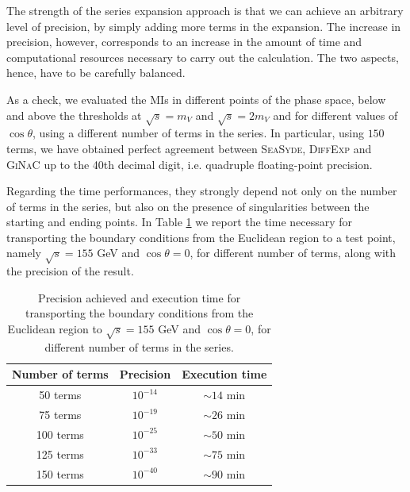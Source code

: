 The strength of the series expansion approach is that we can achieve an arbitrary level of precision, by simply adding more terms in the expansion. The increase in precision, however, corresponds to an increase in the amount of time and computational resources necessary to carry out the calculation. The two aspects, hence, have to be carefully balanced.

As a check, we evaluated the MIs in different points of the phase space, below and above the thresholds at $\sqrt{s}=m_V$ and $\sqrt{s}=2 m_V$ and for different values of $\cos\theta$, using a different number of terms in the series. In particular, using $150$ terms, we have obtained perfect agreement between \textsc{SeaSyde}, \textsc{DiffExp} and \textsc{GiNaC} up to the 40th decimal digit, i.e. quadruple floating-point precision. 

Regarding the time performances, they strongly depend not only on the number of terms in the series, but also on the presence of singularities between the starting and ending points. In Table \ref{table:checks} we report the time necessary for transporting the boundary conditions from the Euclidean region to a test point, namely $\sqrt{s}=155$ GeV and $\cos\theta=0$, for different number of terms, along with the precision of the result.

\begin{table}[ht!]
    \centering
    \begin{tabular}{c c c}
    \toprule
    Number of terms & Precision & Execution time\\
    \toprule
    50 terms & $10^{-14}$ & $\sim 14$ min\\
    \midrule
    75 terms & $10^{-19}$ & $\sim 26$ min\\
    \midrule
    100 terms & $10^{-25}$ & $\sim 50$ min\\
    \midrule
    125 terms & $10^{-33}$ & $\sim 75$ min\\
    \midrule
    150 terms & $10^{-40}$ & $\sim 90$ min\\
    \toprule
    \end{tabular}
    \caption{Precision achieved and execution time for transporting the boundary conditions from the Euclidean region to $\sqrt{s}=155$ GeV and $\cos\theta=0$, for different number of terms in the series.}
    \label{table:checks}
\end{table}


